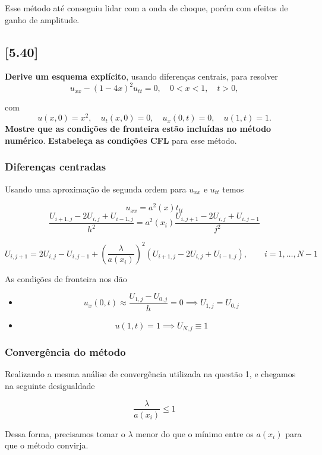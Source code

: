 \documentclass[11pt]{article}
\begin{document}
    Esse método até conseguiu lidar com a onda de choque, porém com efeitos
de ganho de amplitude.

    \hypertarget{section}{%
\subsection{{[}5.40{]}}}

\textbf{Derive um esquema explícito}, usando diferenças centrais, para
resolver
\[u_{xx} - (1 - 4x)^2 u_{tt} = 0, \quad 0 < x < 1, \quad t > 0,\]

com
\[u(x, 0) = x^2, \quad u_t(x, 0) = 0, \quad u_x(0, t) = 0, \quad u(1, t) = 1.\]
\textbf{Mostre que as condições de fronteira estão incluídas no método
numérico}. \textbf{Estabeleça as condições CFL} para esse método.

    \hypertarget{diferenuxe7as-centradas}{%
\subsubsection{Diferenças centradas}}

Usando uma aproximação de segunda ordem para \(u_{xx}\) e \(u_{tt}\)
temos

\[u_{xx} = a^2(x)t_{tt}\] \[
\frac{
  U_{i+1,j} - 2U_{i,j} + U_{i-1,j}
}{h^2} = a^2(x_i)
\frac{
  U_{i,j+1} - 2U_{i,j} + U_{i,j-1}
}{j^2}
\]

\[
U_{i,j+1} = 2U_{i,j} - U_{i,j-1} + \left(\frac{\lambda}{a(x_i)}\right)^2\left(U_{i+1,j} - 2U_{i,j} + U_{i-1,j}\right), \qquad i=1,\ldots,N-1
\]

    As condições de fronteira nos dão

\begin{itemize}
\item
  \[u_x(0,t) \approx \frac{U_{1,j} - U_{0,j}}{h} = 0\implies U_{1,j} = U_{0,j}\]
\item
  \[u(1,t) = 1 \implies U_{N,j} \equiv 1\]
\end{itemize}

    \hypertarget{converguxeancia-do-muxe9todo}{%
\subsubsection{Convergência do
método}}

Realizando a mesma análise de convergência utilizada na questão 1, e
chegamos na seguinte desigualdade

\[\frac{\lambda}{a(x_i)}\le 1\]

Dessa forma, precisamos tomar o \(\lambda\) menor do que o mínimo entre
os \(a(x_i)\) para que o método convirja.
\end{document}
